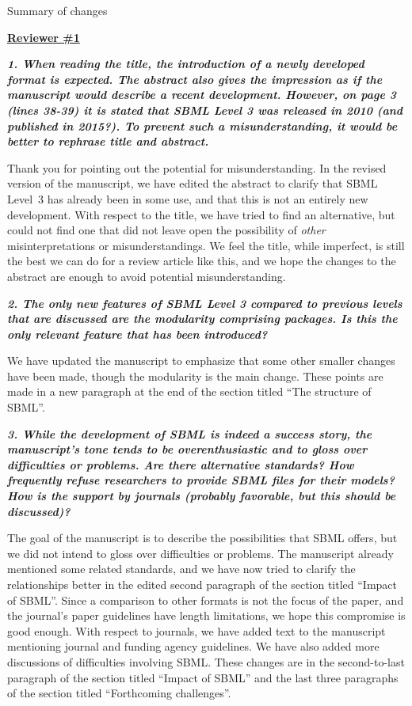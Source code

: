 \documentclass[11pt]{mhletter}
\begin{document}
\clearpage

\begin{center}
\large Summary of changes
\end{center}

\textbf{\underline{Reviewer \#1}}

\textbf{\textit{1. When reading the title, the introduction of a newly developed format is expected. The abstract also gives the impression as if the manuscript would describe a recent development. However, on page 3 (lines 38-39) it is stated that SBML Level 3 was released in 2010 (and published in 2015?). To prevent such a misunderstanding, it would be better to rephrase title and abstract.}}

Thank you for pointing out the potential for misunderstanding.  In the revised version of the manuscript, we have edited the abstract to clarify that SBML Level~3 has already been in some use, and that this is not an entirely new development.  With respect to the title, we have tried to find an alternative, but could not find one that did not leave open the possibility of \emph{other} misinterpretations or misunderstandings.  We feel the title, while imperfect, is still the best we can do for a review article like this, and we hope the changes to the abstract are enough to avoid potential misunderstanding.


\textbf{\textit{2. The only new features of SBML Level 3 compared to previous levels that are discussed are the modularity comprising packages. Is this the only relevant feature that has been introduced?}}

We have updated the manuscript to emphasize that some other smaller changes have been made, though the modularity is the main change.  These points are made in a new paragraph at the end of the section titled ``The structure of SBML''.


\textbf{\textit{3. While the development of SBML is indeed a success story, the manuscript's tone tends to be overenthusiastic and to gloss over difficulties or problems. Are there alternative standards? How frequently refuse researchers to provide SBML files for their models? How is the support by journals (probably favorable, but this should be discussed)?}}

The goal of the manuscript is to describe the possibilities that SBML offers, but we did not intend to gloss over difficulties or problems.  The manuscript already mentioned some related standards, and we have now tried to clarify the relationships better in the edited second paragraph of the section titled ``Impact of SBML''.  Since a comparison to other formats is not the focus of the paper, and the journal's paper guidelines have length limitations, we hope this compromise is good enough.  With respect to journals, we have added text to the manuscript mentioning journal and funding agency guidelines.  We have also added more discussions of difficulties involving SBML.  These changes are in the second-to-last paragraph of the section titled ``Impact of SBML'' and the last three paragraphs of the section titled ``Forthcoming challenges''.
\end{document}
